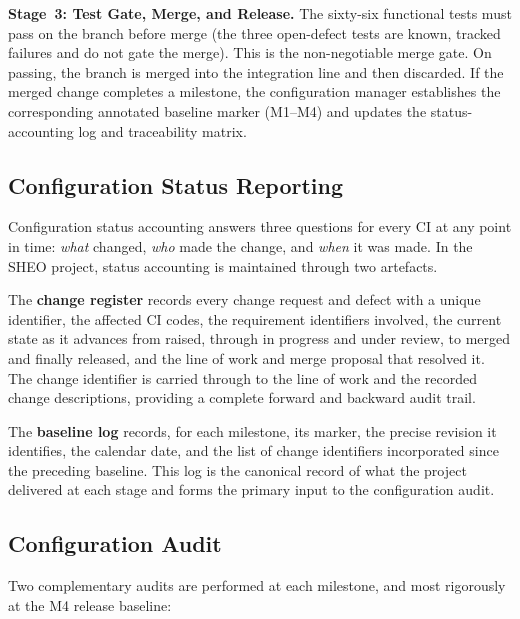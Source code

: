 \textbf{Stage~3: Test Gate, Merge, and Release.}
The sixty-six functional tests must pass on the branch before
merge (the three open-defect tests are known, tracked failures and do not gate the
merge). This is the non-negotiable merge gate. On passing, the branch is merged into
the integration line and then discarded. If the merged change completes a milestone,
the configuration manager establishes the corresponding annotated baseline marker
(M1--M4) and updates the status-accounting log and traceability matrix.

\subsection{Configuration Status Reporting}
\label{sec:scm-status}

Configuration status accounting answers three questions for every CI at any point
in time: \emph{what} changed, \emph{who} made the change, and \emph{when} it was
made. In the SHEO project, status accounting is maintained through two artefacts.

The \textbf{change register} records every change request and defect with a unique
identifier, the affected CI codes, the requirement identifiers involved, the current
state as it advances from raised, through in progress and under review, to merged and
finally released, and the line of work and merge proposal that resolved it. The
change identifier is carried through to the line of work and the recorded change
descriptions, providing a complete forward and backward audit trail.

The \textbf{baseline log} records, for each milestone, its marker, the precise
revision it identifies, the calendar date, and the list of change identifiers
incorporated since the preceding baseline. This log is the canonical record of what
the project delivered at each stage and forms the primary input to the configuration
audit.

\subsection{Configuration Audit}
\label{sec:scm-audit}

Two complementary audits are performed at each milestone, and most rigorously at
the M4 release baseline:

